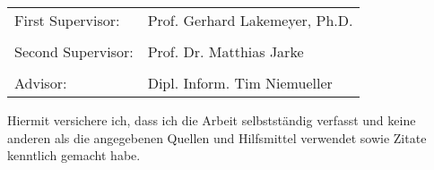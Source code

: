 \newpage
\Large
\begin{tabular}{ l l }
First Supervisor: & Prof. Gerhard Lakemeyer, Ph.D.\\
\\
Second Supervisor: & Prof. Dr. Matthias Jarke\\
\\
Advisor: &  Dipl. Inform. Tim Niemueller\\
\end{tabular}

\vspace{7cm}
Hiermit versichere ich, dass ich die Arbeit selbstständig verfasst und keine anderen als die angegebenen Quellen und Hilfsmittel verwendet sowie Zitate kenntlich gemacht habe.\\

\vspace{3cm}

\large
\makebox[2.5in]{\hrulefill} \hspace {1.0in} \makebox[2.5in]{\hrulefill} \\
 \hspace {1.3in}  \\
\normalsize

